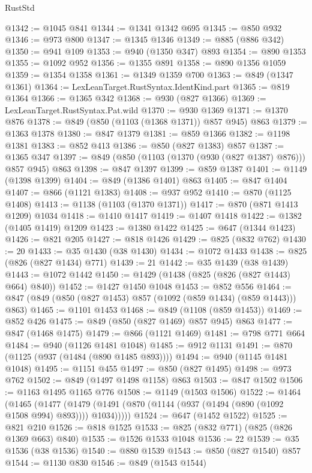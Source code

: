 \begin{lexlean}{RustStd}
\begin{coremodule}
@1342 := @1045 @841
@1344 := @1341 @1342 @695
@1345 := @850 @932
@1346 := @973 @800
@1347 := @1345 @1346
@1349 := @885 (@886 @342)
@1350 := @941 @109
@1353 := @940 (@1350 @347) @893
@1354 := @890 @1353
@1355 := @1092 @952
@1356 := @1355 @891
@1358 := @890 @1356 @1059
@1359 := @1354 @1358
@1361 := @1349 @1359 @700
@1363 := @849 (@1347 @1361)
@1364 := LexLeanTarget.RustSyntax.IdentKind.part
@1365 := @819 @1364
@1366 := @1365 @342
@1368 := @930 (@827 @1366)
@1369 := LexLeanTarget.RustSyntax.Pat.wild
@1370 := @930 @1369
@1371 := @1370 @876
@1378 := @849 (@850 (@1103 (@1368 @1371)) @857 @945) @863
@1379 := @1363 @1378
@1380 := @847 @1379
@1381 := @859 @1366
@1382 := @1198 @1381
@1383 := @852 @413
@1386 := @850 (@827 @1383) @857
@1387 := @1365 @347
@1397 := @849 (@850 (@1103 (@1370 (@930 (@827 @1387) @876))) @857 @945) @863
@1398 := @847 @1397
@1399 := @859 @1387
@1401 := @1149 (@1398 @1399)
@1404 := @849 (@1386 @1401) @863
@1405 := @847 @1404
@1407 := @866 (@1121 @1383)
@1408 := @937 @952
@1410 := @870 (@1125 @1408)
@1413 := @1138 (@1103 (@1370 @1371))
@1417 := @870 (@871 @1413 @1209) @1034
@1418 := @1410 @1417
@1419 := @1407 @1418
@1422 := @1382 (@1405 @1419) @1209
@1423 := @1380 @1422
@1425 := @647 (@1344 @1423)
@1426 := @821 @205
@1427 := @818 @1426
@1429 := @825 (@832 @762)
@1430 := 20
@1433 := @35 @1430 (@38 @1430)
@1434 := @1072 @1433
@1438 := @825 (@826 (@827 @1434) @771)
@1439 := 21
@1442 := @35 @1439 (@38 @1439)
@1443 := @1072 @1442
@1450 := @1429 (@1438 (@825 (@826 (@827 @1443) @664) @840))
@1452 := @1427 @1450 @1048
@1453 := @852 @556
@1464 := @847 (@849 (@850 (@827 @1453) @857 (@1092 (@859 @1434) (@859 @1443))) @863)
@1465 := @1101 @1453
@1468 := @849 (@1108 (@859 @1453))
@1469 := @852 @426
@1475 := @849 (@850 (@827 @1469) @857 @945) @863
@1477 := @847 (@1468 @1475)
@1479 := @866 (@1121 @1469)
@1481 := @798 @771 @664
@1484 := @940 (@1126 @1481 @1048)
@1485 := @912 @1131
@1491 := @870 (@1125 (@937 (@1484 (@890 @1485 @893))))
@1494 := @940 (@1145 @1481 @1048)
@1495 := @1151 @455
@1497 := @850 (@827 @1495)
@1498 := @973 @762
@1502 := @849 (@1497 @1498 @1158) @863
@1503 := @847 @1502
@1506 := @1163 @1495 @1165 @776
@1508 := @1149 (@1503 @1506)
@1522 := @1464
    (@1465
      (@1477 (@1479 (@1491 (@870 (@1144 (@937 (@1494 (@890 (@1092 @1508 @994) @893)))) @1034)))))
@1524 := @647 (@1452 @1522)
@1525 := @821 @210
@1526 := @818 @1525
@1533 := @825 (@832 @771) (@825 (@826 @1369 @663) @840)
@1535 := @1526 @1533 @1048
@1536 := 22
@1539 := @35 @1536 (@38 @1536)
@1540 := @880 @1539
@1543 := @850 (@827 @1540) @857
@1544 := @1130 @830
@1546 := @849 (@1543 @1544)

\end{coremodule}
\end{lexlean}
